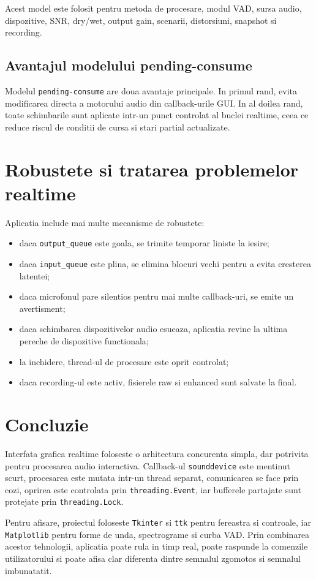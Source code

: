 \documentclass[12pt,a4paper]{article}
\begin{document}
Acest model este folosit pentru metoda de procesare, modul VAD, sursa audio,
dispozitive, SNR, dry/wet, output gain, scenarii, distorsiuni, snapshot si
recording.

\subsection{Avantajul modelului pending-consume}

Modelul \texttt{pending-consume} are doua avantaje principale. In primul rand,
evita modificarea directa a motorului audio din callback-urile GUI. In al doilea
rand, toate schimbarile sunt aplicate intr-un punct controlat al buclei realtime,
ceea ce reduce riscul de conditii de cursa si stari partial actualizate.

\section{Robustete si tratarea problemelor realtime}

Aplicatia include mai multe mecanisme de robustete:

\begin{itemize}
    \item daca \texttt{output\_queue} este goala, se trimite temporar liniste la
    iesire;
    \item daca \texttt{input\_queue} este plina, se elimina blocuri vechi pentru
    a evita cresterea latentei;
    \item daca microfonul pare silentios pentru mai multe callback-uri, se emite
    un avertisment;
    \item daca schimbarea dispozitivelor audio esueaza, aplicatia revine la
    ultima pereche de dispozitive functionala;
    \item la inchidere, thread-ul de procesare este oprit controlat;
    \item daca recording-ul este activ, fisierele raw si enhanced sunt salvate
    la final.
\end{itemize}

\section{Concluzie}

Interfata grafica realtime foloseste o arhitectura concurenta simpla, dar
potrivita pentru procesarea audio interactiva. Callback-ul \texttt{sounddevice}
este mentinut scurt, procesarea este mutata intr-un thread separat, comunicarea
se face prin cozi, oprirea este controlata prin \texttt{threading.Event}, iar
bufferele partajate sunt protejate prin \texttt{threading.Lock}.

Pentru afisare, proiectul foloseste \texttt{Tkinter} si \texttt{ttk} pentru
fereastra si controale, iar \texttt{Matplotlib} pentru forme de unda, spectrograme
si curba VAD. Prin combinarea acestor tehnologii, aplicatia poate rula in timp
real, poate raspunde la comenzile utilizatorului si poate afisa clar diferenta
dintre semnalul zgomotos si semnalul imbunatatit.
\end{document}
